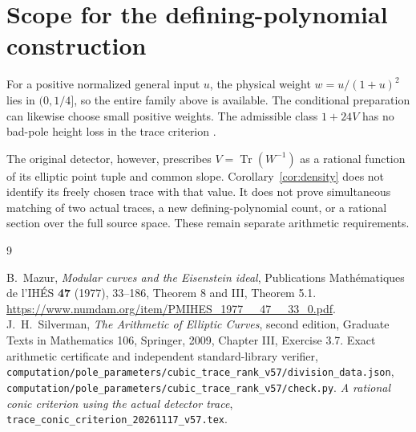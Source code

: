\documentclass[11pt,a4paper]{article}
\DeclareMathOperator{\Tr}{Tr}
\begin{document}
\section{Scope for the defining-polynomial construction}

For a positive normalized general input \(u\), the physical weight
\(w=u/(1+u)^2\) lies in \((0,1/4]\), so the entire family above
is available. The conditional preparation can likewise choose small
positive weights. The admissible class \(1+24V\) has no bad-pole
height loss in the trace criterion \cite{Trace}.

The original detector, however, prescribes
\(V=\Tr(W^{-1})\) as a rational function of its elliptic point tuple
and common slope. Corollary~\ref{cor:density} does not identify its
freely chosen trace with that value. It does not prove simultaneous
matching of two actual traces, a new defining-polynomial count, or a
rational section over the full source space. These remain separate
arithmetic requirements.

\begin{thebibliography}{9}\raggedright
{}B.~Mazur, \emph{Modular curves and the Eisenstein ideal},
Publications Math\'ematiques de l'IH\'ES \textbf{47} (1977), 33--186,
Theorem 8 and III, Theorem 5.1.
\url{https://www.numdam.org/item/PMIHES_1977__47__33_0.pdf}.
J.~H.~Silverman, \emph{The Arithmetic of Elliptic
Curves}, second edition, Graduate Texts in Mathematics 106, Springer,
2009, Chapter III, Exercise 3.7.
Exact arithmetic certificate and independent
standard-library verifier,
\nolinkurl{computation/pole_parameters/cubic_trace_rank_v57/division_data.json},
\nolinkurl{computation/pole_parameters/cubic_trace_rank_v57/check.py}.
\emph{A rational conic criterion using the actual
detector trace},
\nolinkurl{trace_conic_criterion_20261117_v57.tex}.
\end{thebibliography}
\end{document}
